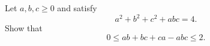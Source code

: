 Let $a, b, c \geq 0$ and satisfy  \[ a^2+b^2+c^2 +abc = 4 . \] Show that \[ 0 \le ab + bc + ca - abc \leq 2. \]
